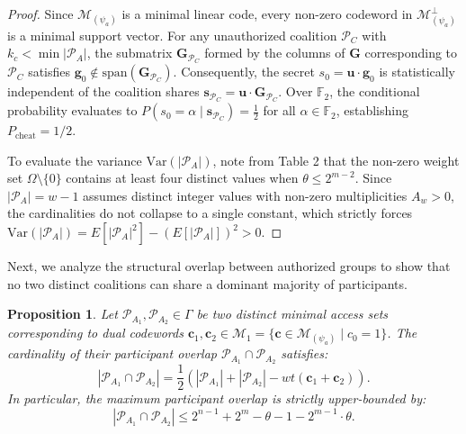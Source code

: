 \documentclass[pdflatex,sn-mathphys-num]{sn-jnl}%
\theoremstyle{thmstyleone}%
\newtheorem{proposition}[theorem]{Proposition}%
\theoremstyle{thmstyletwo}%
\theoremstyle{thmstylethree}%
\begin{document}
\begin{proof}
Since $\mathcal{M}_{(\psi_a)}$ is a minimal linear code, every non-zero codeword in $\mathcal{M}_{(\psi_a)}^\perp$ is a minimal support vector. For any unauthorized coalition $\mathcal{P}_C$ with $k_c < \min |\mathcal{P}_A|$, the submatrix $\mathbf{G}_{\mathcal{P}_C}$ formed by the columns of $\mathbf{G}$ corresponding to $\mathcal{P}_C$ satisfies $\mathbf{g}_0 \notin \text{span}(\mathbf{G}_{\mathcal{P}_C})$. Consequently, the secret $s_0 = \mathbf{u} \cdot \mathbf{g}_0$ is statistically independent of the coalition shares $\mathbf{s}_{\mathcal{P}_C} = \mathbf{u} \cdot \mathbf{G}_{\mathcal{P}_C}$. Over $\mathbb{F}_2$, the conditional probability evaluates to $P(s_0 = \alpha \mid \mathbf{s}_{\mathcal{P}_C}) = \frac{1}{2}$ for all $\alpha \in \mathbb{F}_2$, establishing $P_{\mathrm{cheat}} = 1/2$.

To evaluate the variance $\mathrm{Var}(|\mathcal{P}_A|)$, note from Table 2 that the non-zero weight set $\Omega \setminus \{0\}$ contains at least four distinct values when $\theta \le 2^{m-2}$. Since $|\mathcal{P}_A| = w - 1$ assumes distinct integer values with non-zero multiplicities $A_w > 0$, the cardinalities do not collapse to a single constant, which strictly forces $\mathrm{Var}(|\mathcal{P}_A|) = E[|\mathcal{P}_A|^2] - (E[|\mathcal{P}_A|])^2 > 0$.
\end{proof}

Next, we analyze the structural overlap between authorized groups to show that no two distinct coalitions can share a dominant majority of participants.

\begin{proposition}\label{prop:intersection_hierarchy}
Let $\mathcal{P}_{A_1}, \mathcal{P}_{A_2} \in \Gamma$ be two distinct minimal access sets corresponding to dual codewords $\mathbf{c}_1, \mathbf{c}_2 \in \mathcal{M}_1 = \{\mathbf{c} \in \mathcal{M}_{(\psi_a)} \mid c_0 = 1\}$. The cardinality of their participant overlap $\mathcal{P}_{A_1} \cap \mathcal{P}_{A_2}$ satisfies:
\[
|\mathcal{P}_{A_1} \cap \mathcal{P}_{A_2}| = \frac{1}{2} \left( |\mathcal{P}_{A_1}| + |\mathcal{P}_{A_2}| - wt(\mathbf{c}_1 + \mathbf{c}_2) \right).
\]
In particular, the maximum participant overlap is strictly upper-bounded by:
\[
|\mathcal{P}_{A_1} \cap \mathcal{P}_{A_2}| \le 2^{n-1} + 2^m - \theta - 1 - 2^{m-1} \cdot \theta.
\]
\end{proposition}
\end{document}
